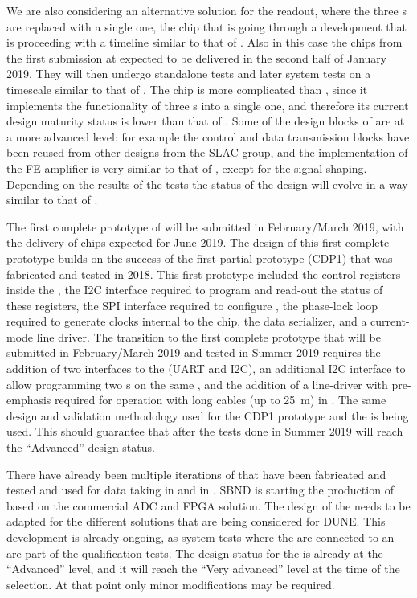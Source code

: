 We are also considering an alternative solution for the readout, where
the three s are replaced with a single one, the 
chip that is going through a development that is proceeding with a 
timeline similar to that of . Also in this case the
chips from the first submission at expected to be delivered in the
second half of January 2019. They will then undergo standalone tests
and later system tests on a timescale similar to that of .
The  chip is more complicated than ,
since it implements the functionality of three s into a
single one, and therefore its current design maturity status is
lower than that of . Some of the design blocks of
 are at a more advanced level: for example the control
and data transmission blocks have been reused from other 
designs from the SLAC group, and the implementation of the FE amplifier
is very similar to that of , except for the signal 
shaping. Depending on the results of the tests the status of the
 design will evolve in a way similar to that of .

The first complete prototype of  will be submitted in 
February/March 2019, with the delivery of chips expected for June 2019.
The design of this first complete prototype builds on the success of
the first partial prototype (CDP1) that was fabricated and tested in 2018.
This first prototype included the control registers inside the 
, the I2C interface required to program and read-out
the status of these registers, the SPI interface required to
configure , the phase-lock loop required to generate
clocks internal to the chip, the data serializer, and a current-mode
line driver. The transition to the first complete prototype that
will be submitted in February/March 2019 and tested in Summer 2019
requires the addition of two interfaces to the  (UART
and I2C), an additional I2C interface to allow programming two
 s on the same , and the
addition of a line-driver with pre-emphasis required for operation
with long cables (up to \SI{25}{m}) in \lar. The same design and
validation methodology used for the CDP1 prototype and the 
is being used. This should guarantee that after the tests done in
Summer 2019  will reach the ``Advanced'' design 
status. 

There have already been multiple iterations of  that
have been fabricated and tested and used for data taking in 
 and in . SBND is starting the
production of  based on the commercial ADC and
FPGA solution. The design of the  needs to be adapted
for the different  solutions that are being considered
for DUNE. This development is already ongoing, as system tests 
where the  are connected to an  are part
of the qualification tests. The design status for the 
is already at the ``Advanced'' level, and it will reach the 
``Very advanced'' level at the time of the 
selection. At that point only minor modifications may be
required. 

